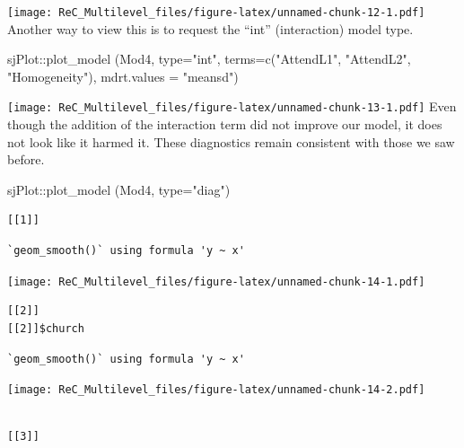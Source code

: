 \documentclass[
  english,
]{book}
\newenvironment{Shaded}{\begin{snugshade}}{\end{snugshade}}
\newcommand{\AttributeTok}[1]{\textcolor[rgb]{0.77,0.63,0.00}{#1}}
\newcommand{\FunctionTok}[1]{\textcolor[rgb]{0.00,0.00,0.00}{#1}}
\newcommand{\NormalTok}[1]{#1}
\newcommand{\SpecialCharTok}[1]{\textcolor[rgb]{0.00,0.00,0.00}{#1}}
\newcommand{\StringTok}[1]{\textcolor[rgb]{0.31,0.60,0.02}{#1}}
\begin{document}
\texttt{[image: ReC\_Multilevel\_files/figure-latex/unnamed-chunk-12-1.pdf]}
Another way to view this is to request the ``int'' (interaction) model type.

\begin{Shaded}
\begin{Highlighting}[]
\NormalTok{sjPlot}\SpecialCharTok{::}\FunctionTok{plot\_model}\NormalTok{ (Mod4, }\AttributeTok{type=}\StringTok{"int"}\NormalTok{, }\AttributeTok{terms=}\FunctionTok{c}\NormalTok{(}\StringTok{"AttendL1"}\NormalTok{, }\StringTok{"AttendL2"}\NormalTok{, }\StringTok{"Homogeneity"}\NormalTok{), }\AttributeTok{mdrt.values =} \StringTok{"meansd"}\NormalTok{)}
\end{Highlighting}
\end{Shaded}

\texttt{[image: ReC\_Multilevel\_files/figure-latex/unnamed-chunk-13-1.pdf]}
Even though the addition of the interaction term did not improve our model, it does not look like it harmed it. These diagnostics remain consistent with those we saw before.

\begin{Shaded}
\begin{Highlighting}[]
\NormalTok{sjPlot}\SpecialCharTok{::}\FunctionTok{plot\_model}\NormalTok{ (Mod4, }\AttributeTok{type=}\StringTok{"diag"}\NormalTok{)}
\end{Highlighting}
\end{Shaded}

\begin{verbatim}
[[1]]
\end{verbatim}

\begin{verbatim}
`geom_smooth()` using formula 'y ~ x'
\end{verbatim}

\texttt{[image: ReC\_Multilevel\_files/figure-latex/unnamed-chunk-14-1.pdf]}

\begin{verbatim}
[[2]]
[[2]]$church
\end{verbatim}

\begin{verbatim}
`geom_smooth()` using formula 'y ~ x'
\end{verbatim}

\texttt{[image: ReC\_Multilevel\_files/figure-latex/unnamed-chunk-14-2.pdf]}

\begin{verbatim}

[[3]]
\end{verbatim}
\end{document}
